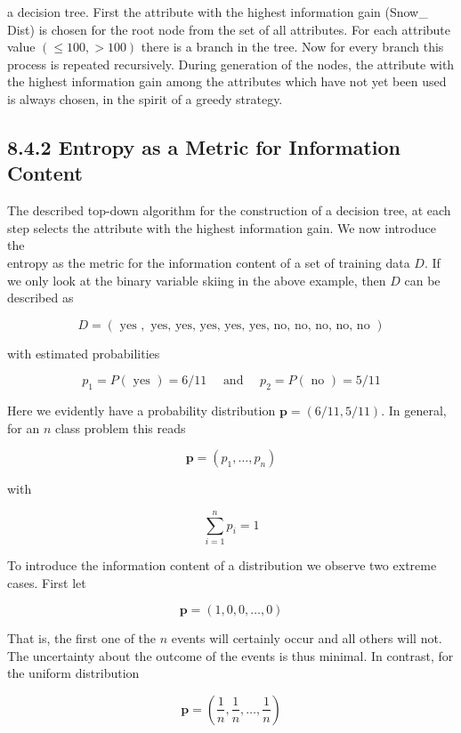 \documentclass[10pt]{book}
\begin{document}
\begin{center}
\begin{enumerate}
\begin{center}
a decision tree. First the attribute with the highest information gain (Snow\_ Dist) is chosen for the root node from the set of all attributes. For each attribute value $(\leq 100,>100)$ there is a branch in the tree. Now for every branch this process is repeated recursively. During generation of the nodes, the attribute with the highest information gain among the attributes which have not yet been used is always chosen, in the spirit of a greedy strategy.


\subsection*{8.4.2 Entropy as a Metric for Information Content}
The described top-down algorithm for the construction of a decision tree, at each step selects the attribute with the highest information gain. We now introduce the\\
entropy as the metric for the information content of a set of training data $D$. If we only look at the binary variable skiing in the above example, then $D$ can be described as

$$
D=(\text { yes }, \text { yes, yes, yes, yes, yes, no, no, no, no, no })
$$

with estimated probabilities

$$
p_{1}=P(\text { yes })=6 / 11 \quad \text { and } \quad p_{2}=P(\text { no })=5 / 11
$$

Here we evidently have a probability distribution $\boldsymbol{p}=(6 / 11,5 / 11)$. In general, for an $n$ class problem this reads

$$
\boldsymbol{p}=\left(p_{1}, \ldots, p_{n}\right)
$$

with

$$
\sum_{i=1}^{n} p_{i}=1
$$

To introduce the information content of a distribution we observe two extreme cases. First let


\begin{equation*}
\boldsymbol{p}=(1,0,0, \ldots, 0) \tag{8.4}
\end{equation*}


That is, the first one of the $n$ events will certainly occur and all others will not. The uncertainty about the outcome of the events is thus minimal. In contrast, for the uniform distribution


\begin{equation*}
\boldsymbol{p}=\left(\frac{1}{n}, \frac{1}{n}, \ldots, \frac{1}{n}\right) \tag{8.5}
\end{equation*}



\end{center}
\end{enumerate}
\end{center}
\end{document}
